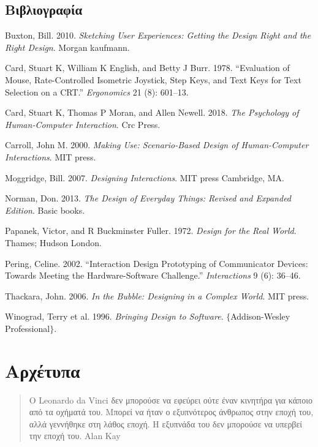 \documentclass[
]{article}
\newlength{\cslhangindent}
\newlength{\cslentryspacingunit} %
\newenvironment{CSLReferences}[2] %
 {%
  \setlength{\parindent}{0pt}
  \ifodd #1
  \let\oldpar\par
  \def\par{\hangindent=\cslhangindent\oldpar}
  \fi
  \setlength{\parskip}{#2\cslentryspacingunit}
 }%
 {}
\begin{document}
\hypertarget{ux3b2ux3b9ux3b2ux3bbux3b9ux3bfux3b3ux3c1ux3b1ux3c6ux3afux3b1}{%
\subsection*{Βιβλιογραφία}\label{ux3b2ux3b9ux3b2ux3bbux3b9ux3bfux3b3ux3c1ux3b1ux3c6ux3afux3b1}}

\hypertarget{refs}{}
\begin{CSLReferences}{0}{0}
\end{CSLReferences}

Buxton, Bill. 2010. \emph{Sketching User Experiences: Getting the Design
Right and the Right Design}. Morgan kaufmann.

Card, Stuart K, William K English, and Betty J Burr. 1978. {``Evaluation
of Mouse, Rate-Controlled Isometric Joystick, Step Keys, and Text Keys
for Text Selection on a CRT.''} \emph{Ergonomics} 21 (8): 601--13.

Card, Stuart K, Thomas P Moran, and Allen Newell. 2018. \emph{The
Psychology of Human-Computer Interaction}. Crc Press.

Carroll, John M. 2000. \emph{Making Use: Scenario-Based Design of
Human-Computer Interactions}. MIT press.

Moggridge, Bill. 2007. \emph{Designing Interactions}. MIT press
Cambridge, MA.

Norman, Don. 2013. \emph{The Design of Everyday Things: Revised and
Expanded Edition}. Basic books.

Papanek, Victor, and R Buckminster Fuller. 1972. \emph{Design for the
Real World}. Thames; Hudson London.

Pering, Celine. 2002. {``Interaction Design Prototyping of Communicator
Devices: Towards Meeting the Hardware-Software Challenge.''}
\emph{Interactions} 9 (6): 36--46.

Thackara, John. 2006. \emph{In the Bubble: Designing in a Complex
World}. MIT press.

Winograd, Terry et al. 1996. \emph{Bringing Design to Software}.
\(\{\)Addison-Wesley Professional\(\}\).

\hypertarget{ux3b1ux3c1ux3c7ux3adux3c4ux3c5ux3c0ux3b1}{%
\section{Αρχέτυπα}\label{ux3b1ux3c1ux3c7ux3adux3c4ux3c5ux3c0ux3b1}}

\begin{quote}
O Leonardo da Vinci δεν μπορούσε να εφεύρει ούτε έναν κινητήρα για
κάποιο από τα οχήματά του. Μπορεί να ήταν ο εξυπνότερος άνθρωπος στην
εποχή του, αλλά γεννήθηκε στη λάθος εποχή. Η εξυπνάδα του δεν μπορούσε
να υπερβεί την εποχή του. Alan Kay
\end{quote}
\end{document}
